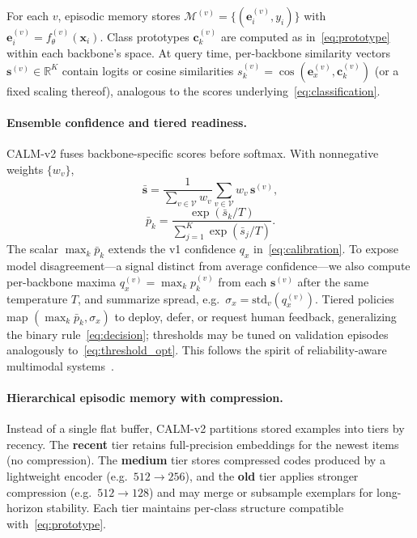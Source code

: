 \documentclass{article}
\begin{document}
For each $v$, episodic memory stores $\mathcal{M}^{(v)}=\{(\mathbf{e}^{(v)}_i,y_i)\}$ with $\mathbf{e}^{(v)}_i=f_\theta^{(v)}(\mathbf{x}_i)$. Class prototypes $\mathbf{c}^{(v)}_k$ are computed as in~\eqref{eq:prototype} within each backbone's space. At query time, per-backbone similarity vectors $\mathbf{s}^{(v)}\in\mathbb{R}^K$ contain logits or cosine similarities $s^{(v)}_k = \cos(\mathbf{e}^{(v)}_x,\mathbf{c}^{(v)}_k)$ (or a fixed scaling thereof), analogous to the scores underlying~\eqref{eq:classification}.

\paragraph{Ensemble confidence and tiered readiness.}
CALM-v2 fuses backbone-specific scores before softmax. With nonnegative weights $\{w_v\}$,
\begin{equation}
\bar{\mathbf{s}}=\frac{1}{\sum_{v\in\mathcal{V}} w_v}\sum_{v\in\mathcal{V}} w_v\, \mathbf{s}^{(v)},
\end{equation}
\begin{equation}
\bar{p}_k=\frac{\exp(\bar{s}_k / T)}{\sum_{j=1}^{K}\exp(\bar{s}_j / T)}.
\end{equation}
The scalar $\max_k \bar{p}_k$ extends the v1 confidence $q_x$ in~\eqref{eq:calibration}. To expose model disagreement---a signal distinct from average confidence---we also compute per-backbone maxima $q_x^{(v)}=\max_k p^{(v)}_k$ from each $\mathbf{s}^{(v)}$ after the same temperature $T$, and summarize spread, e.g.\ $\sigma_x = \mathrm{std}_v(q_x^{(v)})$. Tiered policies map $(\max_k\bar{p}_k,\sigma_x)$ to deploy, defer, or request human feedback, generalizing the binary rule~\eqref{eq:decision}; thresholds may be tuned on validation episodes analogously to~\eqref{eq:threshold_opt}. This follows the spirit of reliability-aware multimodal systems~\citep{angelopoulos2021conformal,chen2024conformalvlm}.

\paragraph{Hierarchical episodic memory with compression.}
Instead of a single flat buffer, CALM-v2 partitions stored examples into tiers by recency. The \textbf{recent} tier retains full-precision embeddings for the newest items (no compression). The \textbf{medium} tier stores compressed codes produced by a lightweight encoder (e.g.\ $512\!\rightarrow\!256$), and the \textbf{old} tier applies stronger compression (e.g.\ $512\!\rightarrow\!128$) and may merge or subsample exemplars for long-horizon stability. Each tier maintains per-class structure compatible with~\eqref{eq:prototype}.
\end{document}
